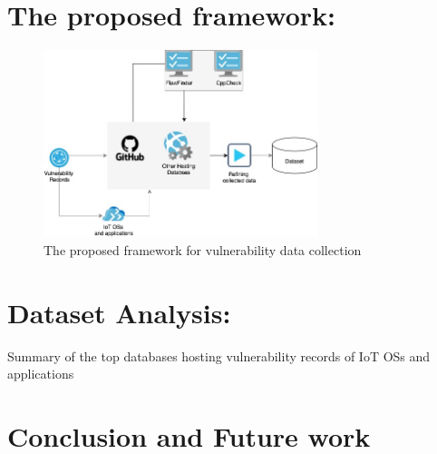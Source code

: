 \documentclass[conference]{IEEEtran}
\begin{document}
\section{The proposed framework:}

\begin{figure}[h!]
  \centering
  \includegraphics[width=8cm]{../figure/framework.jpg}
  \vspace*{-1.5ex}
  \caption{The proposed framework for vulnerability data collection}
  \label{fig:lcurve-iot}
\end{figure}


\section{Dataset Analysis:}

\begin{table}[!t]
  \centering
  {\csvlinetotablerow}
  \caption{Summary of the top databases hosting vulnerability records of IoT OSs and applications}
  \label{tab:software}
  \end{table}



\section{Conclusion and Future work}
\label{conclusion}



\printbibliography
\end{document}
